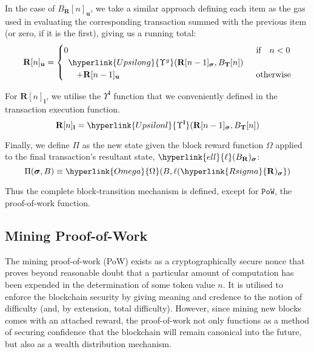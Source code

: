 \documentclass[9pt,oneside]{amsart}
\begin{document}
\begin{multicols}{2}
In the case of \hyperlink{Transaction Receipt}{${B_\mathbf{R}}[n]_\mathbf{u}$}, we take a similar approach defining each item as the gas used in evaluating the corresponding transaction summed with the previous item (or zero, if it is the first), giving us a running total:
\begin{equation}
\mathbf{R}[n]_\mathbf{u} = \begin{cases} 0 & \text{if} \quad n < 0 \\
\begin{array}[b]{l}
\hyperlink{Upsilong}{\Upsilon^g}(\mathbf{R}[n - 1]_{\boldsymbol{\sigma}}, B_\mathbf{T}[n])\\ \quad + \mathbf{R}[n-1]_\mathbf{u}
\end{array}
 & \text{otherwise} \end{cases}
\end{equation}

For $\mathbf{R}[n]_\mathbf{l}$, we utilise the \hyperlink{Upsilonl}{$\Upsilon^\mathbf{l}$} function that we conveniently defined in the transaction execution function.
\begin{equation}
\mathbf{R}[n]_\mathbf{l} =
\hyperlink{Upsilonl}{\Upsilon^\mathbf{l}}(\mathbf{R}[n - 1]_{\boldsymbol{\sigma}}, B_\mathbf{T}[n])
\end{equation}

\hypertarget{Pi}{
Finally, we define \hyperlink{Pi}{$\Pi$} as the new state given the block reward function \hyperlink{Omega}{$\Omega$} applied to the final transaction's resultant state, $\hyperlink{ell}{\ell}(B_\mathbf{R})_{\boldsymbol{\sigma}}$:
\begin{equation}
\Pi(\boldsymbol{\sigma}, B) \equiv \hyperlink{Omega}{\Omega}(B, \ell(\hyperlink{R sigma}{\mathbf{R})_{\boldsymbol{\sigma}}})
\end{equation}}

Thus the complete block-transition mechanism is defined, except for $\mathtt{PoW}$, the proof-of-work function.

\subsection{Mining Proof-of-Work} \label{ch:pow}

The mining proof-of-work (PoW) exists as a cryptographically secure nonce that proves beyond reasonable doubt that a particular amount of computation has been expended in the determination of some token value $n$. It is utilised to enforce the blockchain security by giving meaning and credence to the notion of difficulty (and, by extension, total difficulty). However, since mining new blocks comes with an attached reward, the proof-of-work not only functions as a method of securing confidence that the blockchain will remain canonical into the future, but also as a wealth distribution mechanism.


\end{multicols}
\end{document}
